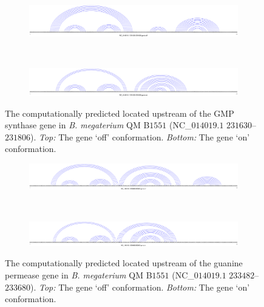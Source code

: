 \begin{figure}[!ht]
\centering
\begin{subfigure}[h]{\textwidth}
\centering
\includegraphics[width=.9\textwidth]{Figures/Ribofinder/NC_014019_1_231630_231806_OFF.pdf}
\end{subfigure} \\
\medskip
\begin{subfigure}[h]{\textwidth}
\centering
\includegraphics[width=.9\textwidth]{Figures/Ribofinder/NC_014019_1_231630_231806_ON.pdf}
\end{subfigure}
\caption[Structures for the putative \rb located upstream of the GMP synthase gene in {\em B. megaterium} QM B$1551$]{The computationally predicted \rb located upstream of the GMP synthase
gene in {\em B. megaterium} QM B$1551$ (NC\_$014019.1$ $231630$--$231806$).
{\em Top:} The gene `off' conformation. {\em Bottom:} The gene `on' conformation.}
\label{fig:figure:NC_014019_1_231630_231806}
\end{figure}
\medskip

\begin{figure}[!ht]
\centering
\begin{subfigure}[h]{\textwidth}
\centering
\includegraphics[width=.9\textwidth]{Figures/Ribofinder/NC_014019_1_233482_233680_OFF.pdf}
\end{subfigure} \\
\medskip
\begin{subfigure}[h]{\textwidth}
\centering
\includegraphics[width=.9\textwidth]{Figures/Ribofinder/NC_014019_1_233482_233680_ON.pdf}
\end{subfigure}
\caption[Structures for the putative \rb located upstream of the guanine permease gene in {\em B. megaterium} QM B$1551$]{The computationally predicted \rb located upstream of the guanine permease
gene in {\em B. megaterium} QM B$1551$ (NC\_$014019.1$ $233482$--$233680$).
{\em Top:} The gene `off' conformation. {\em Bottom:} The gene `on' conformation.}
\label{fig:figure:NC_014019_1_233482_233680}
\end{figure}
\medskip

